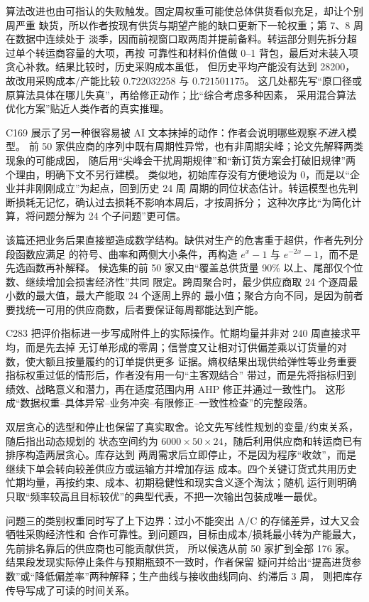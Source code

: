 算法改进也由可指认的失败触发。固定周权重可能使总体供货看似充足，却让个别周严重
缺货，所以作者按现有供货与期望产能的缺口更新下一轮权重；第 7、8 周在数据中连续处于
淡季，因而前视窗口取两周并提前备料。转运部分则先拆分超过单个转运商容量的大项，再按
可靠性和材料价值做 0--1 背包，最后对未装入项贪心补救。结果比较时，历史采购成本虽低，
但历史平均产能没有达到 28200，故改用采购成本/产能比较 $0.722032258$ 与 $0.721501175$。
这几处都先写“原口径或原算法具体在哪儿失真”，再给修正动作；比“综合考虑多种因素，
采用混合算法优化方案”贴近人类作者的真实推理。

C169 展示了另一种很容易被 AI 文本抹掉的动作：作者会说明哪些观察\emph{不进入}模型。
前 50 家供应商的序列中既有周期性异常，也有非周期尖峰；论文先解释两类现象的可能成因，
随后用“尖峰会干扰周期规律”和“新订货方案会打破旧规律”两个理由，明确下文不另行建模。
类似地，初始库存没有方便地设为 0，而是以“企业并非刚刚成立”为起点，回到历史 24 周
周期的同位状态估计。转运模型也先判断损耗无记忆，确认过去损耗不影响本周后，才按周拆分；
这种次序比“为简化计算，将问题分解为 24 个子问题”更可信。

该篇还把业务后果直接塑造成数学结构。缺供对生产的危害重于超供，作者先列分段函数应满足
的符号、曲率和两侧大小条件，再构造 $e^x-1$ 与 $e^{-2x}-1$，而不是先选函数再补解释。
候选集的前 50 家又由“覆盖总供货量 90\% 以上、尾部仅个位数、继续增加会损害经济性”共同
限定。跨周聚合时，最少供应商取 24 个逐周最小数的最大值，最大产能取 24 个逐周上界的
最小值；聚合方向不同，是因为前者要找统一可用的供应商数，后者要保证每周都能达到产能。

C283 把评价指标进一步写成附件上的实际操作。忙期均量并非对 240 周直接求平均，而是先去掉
无订单形成的零周；信誉度又让相对订供偏差乘以订货量的对数，使大额且按量履约的订单提供更多
证据。熵权结果出现供给弹性等业务重要指标权重过低的情形后，作者没有用一句“主客观结合”
带过，而是先将指标归到绩效、战略意义和潜力，再在适度范围内用 AHP 修正并通过一致性门。
这形成“数据权重--具体异常--业务冲突--有限修正--一致性检查”的完整段落。

双层贪心的选型和停止也保留了真实取舍。论文先写线性规划的变量/约束关系，随后指出动态规划的
状态空间约为 $6000\times50\times24$，随后利用供应商和转运商已有排序构造两层贪心。库存达到
两周需求后立即停止，不是因为程序“收敛”，而是继续下单会转向较差供应方或运输方并增加存运
成本。四个关键订货式共用历史忙期均量，再按约束、成本、初期稳健性和现实含义逐个淘汰；随机
运行则明确只取“频率较高且目标较优”的典型代表，不把一次输出包装成唯一最优。

问题三的类别权重同时写了上下边界：过小不能突出 A/C 的存储差异，过大又会牺牲采购经济性和
合作可靠性。到问题四，目标由成本/损耗最小转为产能最大，先前排名靠后的供应商也可能贡献供货，
所以候选从前 50 家扩到全部 176 家。结果段发现实际停止条件与预期瓶颈不一致时，作者保留
疑问并给出“提高进货参数”或“降低偏差率”两种解释；生产曲线与接收曲线同向、约滞后 3 周，
则把库存传导写成了可读的时间关系。

